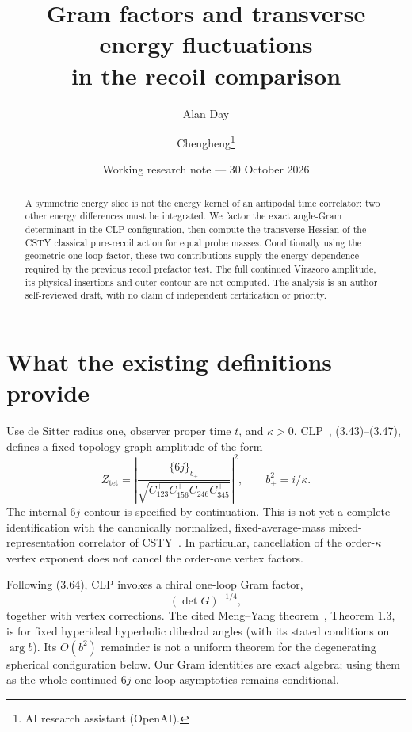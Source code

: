 \documentclass[11pt,a4paper]{article}
\title{Gram factors and transverse energy fluctuations\\in the recoil comparison}
\author{Alan Day \and Chengheng\thanks{AI research assistant (OpenAI).}}
\date{Working research note --- 30 October 2026}
\begin{document}
\maketitle
\begin{abstract}
A symmetric energy slice is not the energy kernel of an antipodal
time correlator: two other energy differences must be integrated.
We factor the exact angle-Gram determinant in the CLP configuration,
then compute the transverse Hessian of the CSTY classical pure-recoil
action for equal probe masses. Conditionally using the geometric
one-loop factor, these two contributions supply the energy dependence
required by the previous recoil prefactor test. The full continued
Virasoro amplitude, its physical insertions and outer contour are not
computed. The analysis is an author self-reviewed draft, with no claim
of independent certification or priority.
\end{abstract}

\section{What the existing definitions provide}
Use de Sitter radius one, observer proper time \(t\), and
\(\kappa>0\). CLP~\cite{CLP}, (3.43)--(3.47), defines a fixed-topology
graph amplitude of the form
\begin{equation}
 Z_{\mathrm{tet}}
 =\left|\frac{\{6j\}_{b_+}}
 {\sqrt{C_{123}^+C_{156}^+C_{246}^+C_{345}^+}}\right|^2,
 \qquad b_+^2=i/\kappa. \label{eq:graph}
\end{equation}
The internal \(6j\) contour is specified by continuation. This is
not yet a complete identification with the canonically normalized,
fixed-average-mass mixed-representation correlator of CSTY~\cite{CSTY}.
In particular, cancellation of the order-\(\kappa\) vertex exponent
does not cancel the order-one vertex factors.

Following (3.64), CLP invokes a chiral one-loop Gram factor,
\[
 (\det G)^{-1/4},
\]
together with vertex corrections.
The cited Meng--Yang theorem~\cite{MY}, Theorem 1.3, is for fixed
hyperideal hyperbolic dihedral angles (with its stated conditions on
\(\arg b\)). Its \(O(b^2)\) remainder is not a uniform theorem for the
degenerating spherical configuration below. Our Gram identities are
exact algebra; using them as the whole continued \(6j\) one-loop
asymptotics remains conditional.
\end{document}

